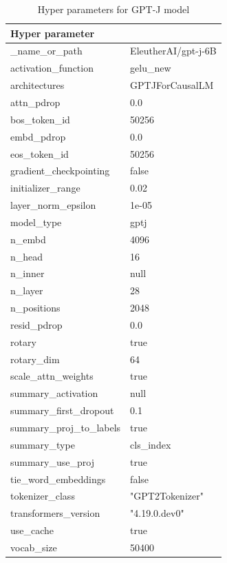 
\begin{table}
    \def\arraystretch{1.5}
    \small
    \centering
    \caption{Hyper parameters for GPT-J model}
    \label{tab:inclusion-exclusion-criteria}
    \begin{tabularx}{\textwidth}{XX}
        \toprule
        \textbf{Hyper parameter} & \\
        \midrule
        \_name\_or\_path & EleutherAI/gpt-j-6B\\
        activation\_function & gelu\_new\\
        architectures & GPTJForCausalLM\\
        attn\_pdrop & 0.0\\
        bos\_token\_id & 50256\\
        embd\_pdrop & 0.0\\
        eos\_token\_id & 50256\\
        gradient\_checkpointing & false\\
        initializer\_range & 0.02\\
        layer\_norm\_epsilon & 1e-05\\
        model\_type & gptj\\
        n\_embd & 4096\\
        n\_head & 16\\
        n\_inner & null\\
        n\_layer & 28\\
        n\_positions & 2048\\
        resid\_pdrop & 0.0\\
        rotary & true\\
        rotary\_dim & 64\\
        scale\_attn\_weights & true\\
        summary\_activation & null\\
        summary\_first\_dropout & 0.1\\
        summary\_proj\_to\_labels & true\\
        summary\_type & cls\_index\\
        summary\_use\_proj & true\\
        tie\_word\_embeddings & false\\
        tokenizer\_class & "GPT2Tokenizer"\\
        transformers\_version & "4.19.0.dev0"\\
        use\_cache & true\\
        vocab\_size & 50400\\
        \bottomrule
    \end{tabularx}
\end{table}

